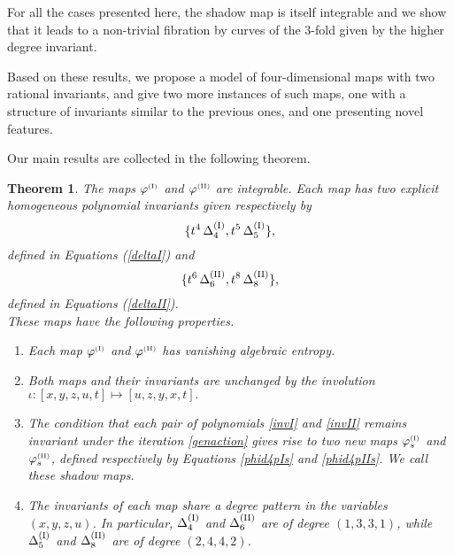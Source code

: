 \documentclass[reqno]{amsart}
\newtheorem{theorem}{Theorem}
\numberwithin{equation}{section}
\numberwithin{figure}{section}
\begin{document}
{ For all the cases presented here}, the
shadow map is itself integrable and we show that it leads to a
non-trivial fibration by curves of the 3-fold given by the higher
degree invariant.

Based on these results,  we propose a model of four-dimensional maps
with two rational invariants, and give two more instances of such maps,
one with a structure of invariants similar to the previous ones, and
one presenting novel features.
{  
Our main results are collected in the following theorem.
\begin{theorem}\label{mainthm}
  The maps $\varphi^{\scriptscriptstyle (\rm I) } $ and
  $\varphi^{\scriptscriptstyle (\rm II) } $ are integrable. Each map
  has two explicit homogeneous polynomial invariants given
  respectively by
  \begin{equation}\label{invI}\{t^4\,\Delta_4^{({\rm I})},t^5\,\Delta_5^{({\rm I})} \},
  \end{equation}
  defined in Equations (\ref{deltaI}) and
  \begin{equation}\label{invII}\{t^6\,\Delta_6^{({\rm II})},t^8\,\Delta_8^{({\rm II})} \},\end{equation}
  defined in Equations (\ref{deltaII}). \\
  These maps have the following  properties. 
  \begin{enumerate}[leftmargin=1.2cm,label=(\alph*)]
    \item Each map $\varphi^{\scriptscriptstyle (\rm I) } $ and $\varphi^{\scriptscriptstyle (\rm II) } $ has vanishing algebraic entropy.\\
    \item Both maps and their invariants are unchanged by the involution $\iota : [x,y,z,u,t] \mapsto [u,z,y,x,t].$
    \item The condition that each pair of polynomials \eqref{invI} and \eqref{invII} remains invariant under the iteration \eqref{genaction} gives rise to two new maps $\varphi_s^{\scriptscriptstyle (\rm I)}$ and  $\varphi_s^{\scriptscriptstyle (\rm II)}$, defined respectively by Equations \eqref{phid4pIs} and \eqref{phid4pIIs}. We call these \emph{shadow maps}.
      \item The invariants of each map share a degree pattern in the variables $(x, y, z, u)$. In particular,  $\Delta_4^{({\rm I})}$ and $\Delta_6^{({\rm II})}$ are of degree $(1, 3, 3, 1)$, while $\Delta_5^{({\rm I})}$ and $\Delta_8^{({\rm II})}$ are of degree $(2, 4, 4, 2)$. 
    \end{enumerate}
  \end{theorem}
}
\end{document}
